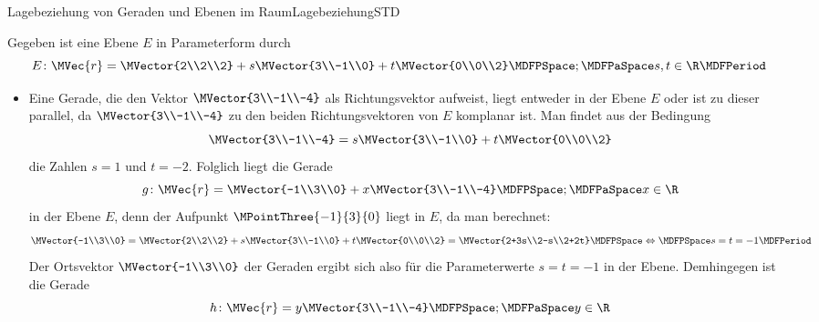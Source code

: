 \begin{MXContent}{Lagebeziehung von Geraden und Ebenen im Raum}{Lagebeziehung}{STD}
\begin{MExample}
Gegeben ist eine Ebene $E$ in Parameterform durch
\[
 E\colon\MVec{r}=\MVector{2\\2\\2}+s\MVector{3\\-1\\0}+t\MVector{0\\0\\2}\MDFPSpace;\MDFPaSpace s,t\in\R \MDFPeriod
\]
\begin{itemize}
 \item Eine Gerade, die den Vektor $\MVector{3\\-1\\-4}$ als Richtungsvektor aufweist, liegt entweder in der Ebene $E$ oder ist zu dieser parallel, da $\MVector{3\\-1\\-4}$ zu den beiden Richtungsvektoren von $E$ komplanar ist. Man findet aus der Bedingung
 \[
  \MVector{3\\-1\\-4}=s\MVector{3\\-1\\0}+t\MVector{0\\0\\2}
 \]
 die Zahlen $s=1$ und $t=-2$. Folglich liegt die Gerade
 \[
  g\colon\MVec{r}=\MVector{-1\\3\\0}+x\MVector{3\\-1\\-4}\MDFPSpace;\MDFPaSpace x\in\R
 \]
 in der Ebene $E$, denn der Aufpunkt $\MPointThree{-1}{3}{0}$ liegt in $E$, da man berechnet:
 \[
  \MVector{-1\\3\\0}=\MVector{2\\2\\2}+s\MVector{3\\-1\\0}+t\MVector{0\\0\\2}=\MVector{2+3s\\2-s\\2+2t}\MDFPSpace\Leftrightarrow\MDFPSpace s=t=-1\MDFPeriod
 \]
 Der Ortsvektor $\MVector{-1\\3\\0}$ der Geraden ergibt sich also für die Parameterwerte $s=t=-1$ in der Ebene. Demhingegen ist die Gerade
 \[
  h\colon\MVec{r}=y\MVector{3\\-1\\-4}\MDFPSpace;\MDFPaSpace y\in\R
\]
\end{itemize}
\end{MExample}
\end{MXContent}
